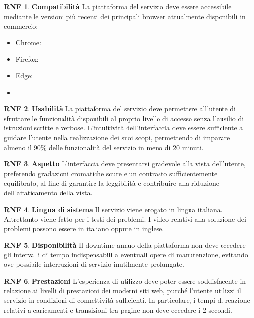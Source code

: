 \documentclass[11pt, a4paper]{article}
\theoremstyle{definition}
\newtheorem{nonfuncreq}{RNF} %
\begin{document}
\begin{nonfuncreq}
\label{compatibility}
\textbf{Compatibilità }
La piattaforma del servizio deve essere accessibile mediante le versioni
più recenti dei principali browser attualmente disponibili in commercio:
\begin{itemize}
    \item Chrome: %
    \item Firefox: %
    \item Edge: %
    \item 
\end{itemize}
\end{nonfuncreq}


\begin{nonfuncreq}
\textbf{Usabilità }
La piattaforma del servizio deve permettere all'utente di sfruttare le
funzionalità disponibili al proprio livello di accesso senza l'ausilio di
istruzioni scritte e verbose. L'intuitività dell'interfaccia deve essere
sufficiente a guidare l'utente nella realizzazione dei suoi scopi,
permettendo di imparare almeno il 90\% delle funzionalità del servizio in
meno di 20 minuti. 
\end{nonfuncreq}

\begin{nonfuncreq}
\textbf{Aspetto }
L'interfaccia deve presentarsi gradevole alla vista dell'utente, preferendo
gradazioni cromatiche scure e un contrasto sufficientemente equilibrato,
al fine di garantire la leggibilità e contribuire alla riduzione
dell'affaticamento della vista.
\end{nonfuncreq}

\begin{nonfuncreq}
\textbf{Lingua di sistema }
Il servizio viene erogato in lingua italiana. Altrettanto viene fatto per i
testi dei problemi. I video relativi alla soluzione dei problemi possono
essere in italiano oppure in inglese.
\end{nonfuncreq}

\begin{nonfuncreq}
\textbf{Disponibilità }
Il downtime annuo della piattaforma non deve eccedere gli intervalli di
tempo indispensabili a eventuali opere di manutenzione, evitando ove
possibile interruzioni di servizio inutilmente prolungate.
\end{nonfuncreq}

\begin{nonfuncreq}
\textbf{Prestazioni }
L'esperienza di utilizzo deve poter essere soddisfacente in relazione
ai livelli di prestazioni dei moderni siti web, purché l'utente utilizzi
il servizio in condizioni di connettività sufficienti. In particolare,
i tempi di reazione relativi a caricamenti e transizioni tra pagine non
deve eccedere i 2 secondi.
\end{nonfuncreq}
\end{document}

